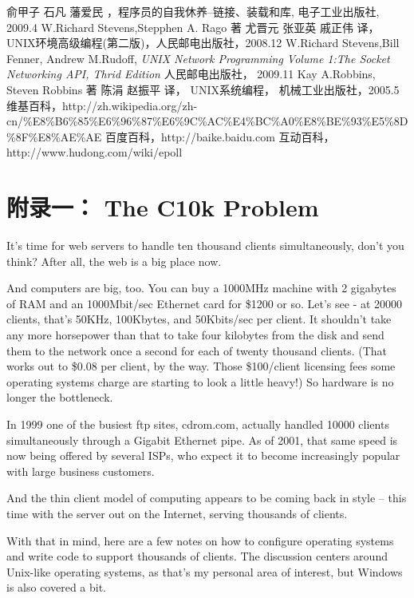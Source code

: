 \documentclass[12pt, twoside, a4paper, xetex]{report}
\begin{document}
\begin{thebibliography}{99}
俞甲子{} 石凡{} 藩爱民 ，程序员的自我休养--链接、装载和库, 电子工业出版社, 2009.4
W.Richard Stevens,Stepphen A. Rago 著 尤晋元 张亚英 戚正伟 译， UNIX环境高级编程(第二版)，人民邮电出版社，2008.12
W.Richard Stevens,Bill Fenner, Andrew M.Rudoff, \emph{UNIX Network Programming Volume 1:The Socket Networking API, Thrid Edition} 人民邮电出版社， 2009.11
 Kay A.Robbins, Steven Robbins 著 陈涓 赵振平 译， UNIX系统编程， 机械工业出版社，2005.5
维基百科，http://zh.wikipedia.org/zh-cn/\%E8\%B6\%85\%E6\%96\%87\%E6\%9C\%AC\%E4\%BC\%A0\%E8\%BE\%93\%E5\%8D\%8F\%E8\%AE\%AE
百度百科，http://baike.baidu.com
互动百科，http://www.hudong.com/wiki/epoll

\end{thebibliography}


\chapter{附录一： The C10k Problem}

It's time for web servers to handle ten thousand clients simultaneously, don't you think? After all, the web is a big place now.

And computers are big, too. You can buy a 1000MHz machine with 2 gigabytes of RAM and an 1000Mbit/sec Ethernet card for \$1200 or so. Let's see - at 20000 clients, that's 50KHz, 100Kbytes, and 50Kbits/sec per client. It shouldn't take any more horsepower than that to take four kilobytes from the disk and send them to the network once a second for each of twenty thousand clients. (That works out to \$0.08 per client, by the way. Those \$100/client licensing fees some operating systems charge are starting to look a little heavy!) So hardware is no longer the bottleneck.

In 1999 one of the busiest ftp sites, cdrom.com, actually handled 10000 clients simultaneously through a Gigabit Ethernet pipe. As of 2001, that same speed is now being offered by several ISPs, who expect it to become increasingly popular with large business customers.

And the thin client model of computing appears to be coming back in style -- this time with the server out on the Internet, serving thousands of clients.

With that in mind, here are a few notes on how to configure operating systems and write code to support thousands of clients. The discussion centers around Unix-like operating systems, as that's my personal area of interest, but Windows is also covered a bit.
\end{document}
